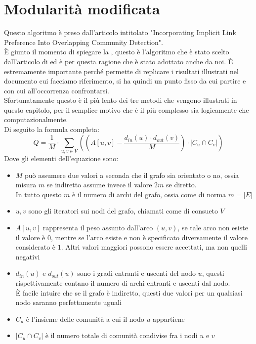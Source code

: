 \section{Modularità modificata}
Questo algoritmo è preso dall'articolo intitolato "Incorporating Implicit Link Preference Into Overlapping Community Detection".\\
È giunto il momento di spiegare la \mmod, questo è l'algoritmo che è stato scelto dall'articolo di \cnrl ed è per questa ragione che è stato adottato anche da noi. È estremamente importante perché permette di replicare i risultati illustrati nel documento cui facciamo riferimento, si ha quindi un punto fisso da cui partire e con cui all'occorrenza confrontarsi.\\
Sfortunatamente questo è il più lento dei tre metodi che vengono illustrati in questo capitolo, per il semplice motivo che è il più complesso sia logicamente che computazionalmente.\\
Di seguito la formula completa:
\begin{equation}
	Q = \frac{1}{M} \cdot \sum_{u,v \in V}
		\left(
			\left( A \left[ u,v \right] - \frac{ d_{in}\left(u\right) \cdot d_{out}\left(v\right) }{M} \right)
			\cdot
			|C_u \cap C_v| 
		\right)
	\label{eq:m_mod}
\end{equation}
Dove gli elementi dell'equazione sono:
\begin{itemize}
	\item $M$ può assumere due valori a seconda che il grafo sia orientato o no, ossia misura $m$ se indiretto assume invece il valore $2m$ se diretto.\\
	In tutto questo $m$ è il numero di archi del grafo, ossia come di norma $m=|E|$
	\item $u,v$ sono gli iteratori sui nodi del grafo, chiamati come di consueto $V$
	\item $A \left[ u,v \right]$ rappresenta il peso assunto dall'arco $(u, v)$, se tale arco non esiste il valore è $0$, mentre se l'arco esiste e non è specificato diversamente il valore considerato è $1$. Altri valori maggiori possono essere accettati, ma non quelli negativi
	\item $d_{in}\left(u\right)$ e $d_{out}\left(u\right)$ sono i gradi entranti e uscenti del nodo $u$, questi rispettivamente contano il numero di archi entranti e uscenti dal nodo.\\
	È facile intuire che se il grafo è indiretto, questi due valori per un qualsiasi nodo saranno perfettamente uguali
	\item $C_u$ è l'insieme delle comunità a cui il nodo $u$ appartiene
	\item $|C_u \cap C_v|$ è il numero totale di comunità condivise fra i nodi $u$ e $v$
\end{itemize}
